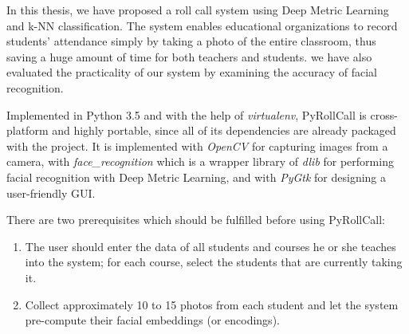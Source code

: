 In this thesis, we have proposed a roll call system using Deep Metric Learning and k-NN classification.
The system enables educational organizations to record students' attendance simply by taking a photo of
the entire classroom, thus saving a huge amount of time for both teachers and students.
we have also evaluated the practicality of our system by examining the accuracy of facial recognition.
\vspace{0.5cm}

Implemented in Python 3.5 and with the help of \emph{virtualenv}, PyRollCall is cross-platform and highly portable,
since all of its dependencies are already packaged with the project. It is implemented with \emph{OpenCV}
for capturing images from a camera, with \emph{face\_recognition} which is a wrapper library of \emph{dlib}
for performing facial recognition with Deep Metric Learning, and with \emph{PyGtk} for designing a user-friendly GUI.
\vspace{0.5cm}

There are two prerequisites which should be fulfilled before using PyRollCall:

\begin{enumerate}
  \item The user should enter the data of all students and courses he or she teaches into the system; for each course, select the students that are currently taking it.
  \item Collect approximately 10 to 15 photos from each student and let the system pre-compute their facial embeddings (or encodings).
\end{enumerate}
